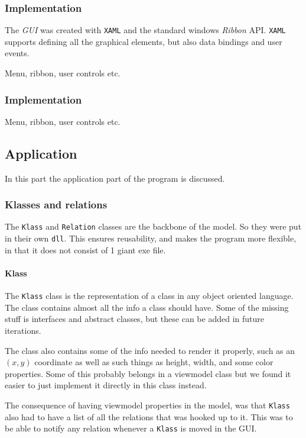 \subsubsection{Implementation} 
The \textit{GUI} was created with \texttt{XAML} and the standard windows
\textit{Ribbon} API. \texttt{XAML} supports defining all the graphical elements,
but also data bindings and user events.


Menu, ribbon, user controls etc.

\subsubsection{Implementation}
Menu, ribbon, user controls etc.


\subsection{Application}
In this part the application part of the program is discussed.

\subsubsection{Klasses and relations}
The \texttt{Klass} and \texttt{Relation} classes are the backbone of the model.
So they were put in their own \texttt{dll}. This ensures reusability, and makes
the program more flexible, in that it does not consist of 1 giant exe file.

\paragraph{Klass}
The \texttt{Klass} class is the representation of a class in any object oriented
language. The class contains almost all the info a class should have. Some of
the missing stuff is interfaces and abstract classes, but these can be added in
future iterations.

The class also contains some of the info needed to render it properly, such as
an $(x, y)$ coordinate as well as such things as height, width, and some color
properties. Some of this probably belongs in a viewmodel class but we found it
easier to just implement it directly in this class instead.

The consequence of having viewmodel properties in the model, was that
\texttt{Klass} also had to have a list of all the relations that was hooked up
to it. This was to be able to notify any relation whenever a \texttt{Klass} is
moved in the GUI. 

